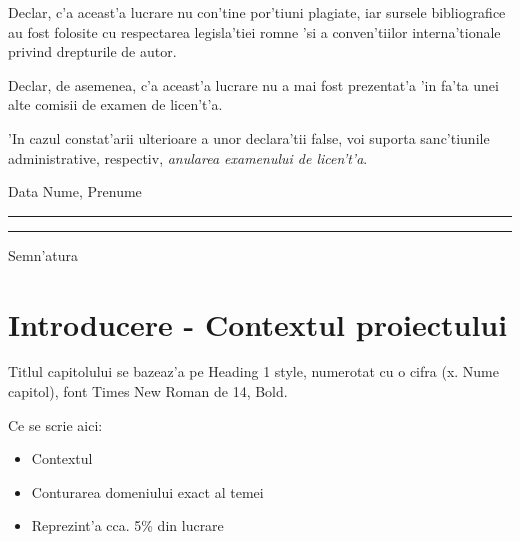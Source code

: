 \documentclass[12pt,a4paper,twoside]{report}
\newcommand{\uline}[1]{\rule[0pt]{#1}{0.4pt}}
\begin{document}
Declar, c'a aceast'a lucrare nu con'tine por'tiuni plagiate, iar sursele bibliografice au fost folosite cu respectarea legisla'tiei rom\ia ne 'si a conven'tiilor interna'tionale privind drepturile de autor.

Declar, de asemenea, c'a aceast'a lucrare nu a mai fost prezentat'a 'in fa'ta unei alte comisii de examen de licen't'a.

'In cazul constat'arii ulterioare a unor declara'tii false, voi suporta sanc'tiunile administrative, respectiv, \emph{anularea examenului de licen't'a}.

\vspace{1.5cm}

Data \hspace{8cm} Nume, Prenume

\vspace{0.5cm}

\uline{3cm} \hspace{5cm} \uline{5cm}

\vspace{1cm}
\hspace{9.4cm}Semn'atura

\thispagestyle{empty}

\newpage


 

\setcounter{page}{1}

\newpage

\tableofcontents

\newpage


\setcounter{page}{1}

\chapter{Introducere - Contextul proiectului}
\pagestyle{headings}

Titlul capitolului se bazeaz'a pe Heading 1 style, numerotat cu o cifra (x. Nume capitol), font Times New Roman de 14, Bold.

Ce se scrie aici:

\begin{itemize}
 \item Contextul
\item Conturarea domeniului exact al temei
\item Reprezint'a cca. 5\% din lucrare
\end{itemize}
\end{document}
